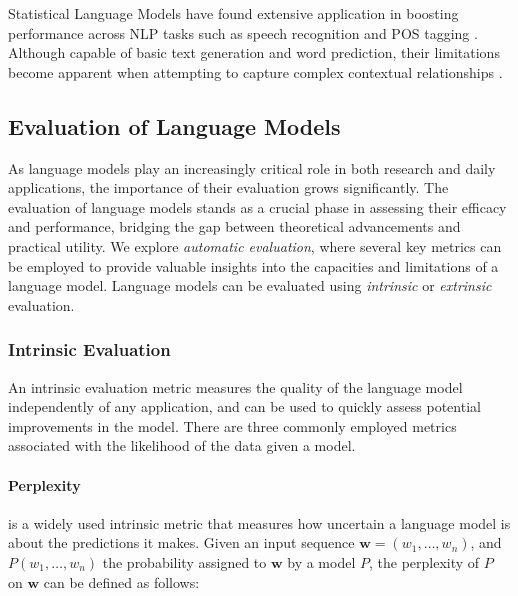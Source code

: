 
Statistical Language Models have found extensive application in boosting performance across \ac{NLP} tasks such as speech recognition \citep{bahl1989tree} and \ac{POS} tagging \citep{thede1999second}. Although capable of basic text generation and word prediction, their limitations become apparent when attempting to capture complex contextual relationships \citep{rosenfeld2000two, arisoy2012deep}.


\subsection{Evaluation of Language Models}

As language models play an increasingly critical role in both research and daily applications, the importance of their evaluation grows significantly. The evaluation of language models stands as a crucial phase in assessing their efficacy and performance, bridging the gap between theoretical advancements and practical utility. We explore \textit{automatic evaluation}, where several key metrics can be employed to provide valuable insights into the capacities and limitations of a language model. Language models can be evaluated using \textit{intrinsic} or \textit{extrinsic} evaluation. 

\subsubsection{Intrinsic Evaluation} 

An intrinsic evaluation metric measures the quality of the language model independently of any application, and can be used to quickly assess potential improvements in the model. There are three commonly employed metrics associated with the likelihood of the data given a model.

\paragraph{Perplexity} is a widely used intrinsic metric that measures how uncertain a language model is about the predictions it makes. Given an input sequence ${\bm{w} = (w_1, \ldots, w_n)}$, and $P(w_1, \ldots, w_n)$ the probability assigned to $\bm{w}$ by a model $P$, the perplexity of $P$ on $\bm{w}$ can be defined as follows:

